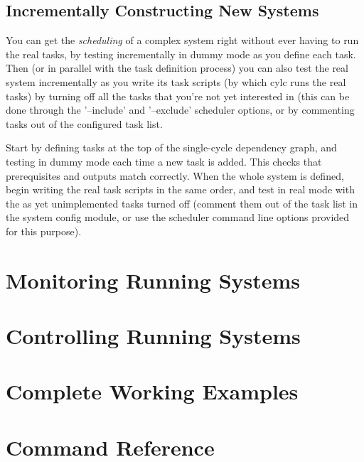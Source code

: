\documentclass[11pt,a4paper]{article}
\begin{document}
\subsection{Incrementally Constructing New Systems} 
\label{IncrementallyConstructingNewSystems}

You can get the {\em scheduling} of a complex system right without ever
having to run the real tasks, by testing incrementally in dummy mode as
you define each task. Then (or in parallel with the task definition
process) you can also test the real system incrementally as you write
its task scripts (by which cylc runs the real tasks) by turning off all
the tasks that you're not yet interested in (this can be done through
the '--include' and '--exclude' scheduler options, or by commenting
tasks out of the configured task list.

Start by defining tasks at the top of the single-cycle dependency graph,
and testing in dummy mode each time a new task is added. This checks
that prerequisites and outputs match correctly. When the whole system is
defined, begin writing the real task scripts in the same order, and test
in real mode with the as yet unimplemented tasks turned off (comment
them out of the task list in the system config module, or use the
scheduler command line options provided for this purpose). 

\section{Monitoring Running Systems}
\label{MonitoringRunningSystems}


\section{Controlling Running Systems}
\label{ControllingRunningSystems}

\section{Complete Working Examples}
\label{CompleteWorkingExamples}




\pagebreak


\section{Command Reference}
\label{CommandReference}
\end{document}
